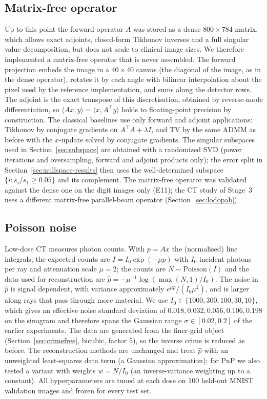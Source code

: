 \subsection{Matrix-free operator}\label{sec:mf}
Up to this point the forward operator $A$ was stored as a dense $800\times784$ matrix, which allows exact adjoints,
closed-form Tikhonov inverses and a full singular value decomposition, but does not scale to clinical image sizes. We
therefore implemented a matrix-free operator that is never assembled. The forward projection embeds the image in a
$40\times40$ canvas (the diagonal of the image, as in the dense operator), rotates it by each angle with bilinear
interpolation about the pixel used by the reference implementation, and sums along the detector rows. The adjoint is the
exact transpose of this discretisation, obtained by reverse-mode differentiation, so $\langle Ax,y\rangle=\langle x,A^{\top}y\rangle$
holds to floating-point precision by construction. The classical baselines use only forward
and adjoint applications: Tikhonov by conjugate gradients on $A^{\top}A+\lambda I$, and TV by the same ADMM as before with the $x$-update solved by
conjugate gradients. The singular subspaces used in Section~\ref{sec:subspace} are obtained with a randomized SVD
\citep{halko2011} (power iterations and oversampling, forward and adjoint products only); the error split in
Section~\ref{sec:nullspace-results} then uses the well-determined subspace $\{i: s_i/s_1\ge0.05\}$ and its complement.
The matrix-free operator was validated against the dense one on the digit images only (E11); the CT study of Stage~3 uses a different matrix-free parallel-beam operator (Section~\ref{sec:lodopab}).

\subsection{Poisson noise}\label{sec:poisson}
Low-dose CT measures photon counts. With $p=Ax$ the (normalised) line integrals, the expected counts are
$I=I_0\exp(-\mu p)$ with $I_0$ incident photons per ray and attenuation scale $\mu=2$; the counts are
$N\sim\mathrm{Poisson}(I)$ and the data used for reconstruction are $\hat p=-\mu^{-1}\log(\max(N,1)/I_0)$.
The noise in $\hat p$ is signal dependent, with variance approximately $e^{\mu p}/(I_0\mu^2)$, and is larger along
rays that pass through more material. We use $I_0\in\{1000,300,100,30,10\}$, which gives an effective noise
standard deviation of $0.018,0.032,0.056,0.106,0.198$ on the sinogram and therefore spans the Gaussian range
$\sigma\in[0.02,0.2]$ of the earlier experiments. The data are generated from the finer-grid object
(Section~\ref{sec:crimefree}, bicubic, factor 5), so the inverse crime is reduced as before. The reconstruction methods are
unchanged and treat $\hat p$ with an unweighted least-squares data term (a Gaussian approximation); for PnP we also
tested a variant with weights $w=N/I_0$ (an inverse-variance weighting up to a constant). All hyperparameters are tuned at each dose on 100 held-out MNIST validation images
and frozen for every test set.

